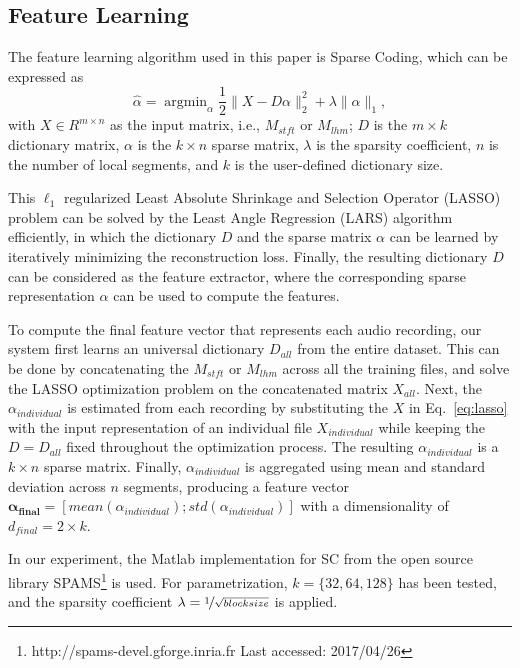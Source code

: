 \documentclass[conference]{IEEEtran}
\begin{document}
\subsection{Feature Learning}\label{subsec:feat_learn}
The feature learning algorithm used in this paper is Sparse Coding, which can be expressed as %
\begin{equation}\label{eq:lasso}
\hat{\alpha} = \mathop{\mathrm{argmin}}_\alpha \frac{1}{2} \| X - D\alpha \|_{2}^{2} + \lambda \| \alpha \|_{1}, 
\end{equation}
%
with $X \in R^{ m \times n}$ as the input matrix, i.e., $M_{stft}$ or $M_{lhm}$; $D$ is the $m \times k$ dictionary matrix, $\alpha$ is the $k \times n$ sparse matrix, $\lambda$ is the sparsity coefficient, $n$ is the number of local segments, and $k$ is the user-defined dictionary size. 

This $\ell_1$ regularized Least Absolute Shrinkage and Selection Operator (LASSO) problem can be solved by the Least Angle Regression (LARS) algorithm efficiently\cite{Efron2004}, in which the dictionary $D$ and the sparse matrix $\alpha$ can be learned by iteratively minimizing the reconstruction loss. Finally, the resulting dictionary $D$ can be considered as the feature extractor, where the corresponding sparse representation $\alpha$ can be used to compute the features. 

To compute the final feature vector that represents each audio recording, our system first learns an universal dictionary $D_{all}$ from the entire dataset. This can be done by concatenating the $M_{stft}$ or $M_{lhm}$ across all the training files, and solve the LASSO optimization problem on the concatenated matrix $X_{all}$. Next, the $\alpha_{individual}$ is estimated from each recording by substituting the $X$ in Eq.~\ref{eq:lasso} with the input representation of an individual file $X_{individual}$ while keeping the $D = D_{all}$ fixed throughout the optimization process. The resulting $\alpha_{individual}$ is a $k \times n$ sparse matrix. Finally, $\alpha_{individual}$ is aggregated using mean and standard deviation across $n$ segments, producing a feature vector $\mathbf{\alpha_{final}} = [mean(\alpha_{individual}); std(\alpha_{individual})]$ with a dimensionality of $d_{final} = 2 \times k$.  

In our experiment, the Matlab implementation for SC from the open source library SPAMS\footnote{http://spams-devel.gforge.inria.fr Last accessed: 2017/04/26}\cite{Mairal2009a} is used. For parametrization, $k = \{32, 64, 128\}$ has been tested, and the sparsity coefficient $\lambda = \nicefrac{1}{\sqrt{block size}}$ is applied. 
\end{document}
